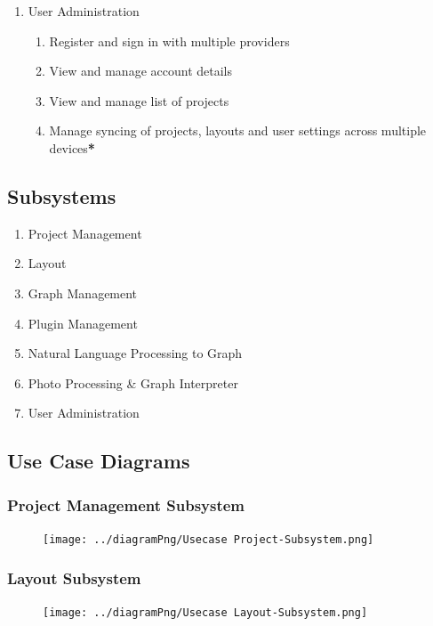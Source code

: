 \documentclass[11pt,a4paper]{article}
\begin{document}
\begin{enumerate}[label=\arabic*.]
    \item User Administration
    \begin{enumerate}[label*=\arabic*.]
	\item Register and sign in with multiple providers
	\item View and manage account details
	\item View and manage list of projects
	\item Manage syncing of projects, layouts and user settings across multiple
	devices\textbf{*}
    \end{enumerate}
\end{enumerate}

\subsection*{Subsystems}
\begin{enumerate}
    \item Project Management
    \item Layout
    \item Graph Management
    \item Plugin Management
    \item Natural Language Processing to Graph
    \item Photo Processing \& Graph Interpreter
    \item User Administration
\end{enumerate}

\pagebreak

\subsection*{Use Case Diagrams}

\subsubsection*{Project Management Subsystem}
\begin{figure}[htbp]
    \centering
    \texttt{[image: ../diagramPng/Usecase Project-Subsystem.png]}
\end{figure}

\pagebreak
\subsubsection*{Layout Subsystem}
\begin{figure}[htbp]
    \centering
     \texttt{[image: ../diagramPng/Usecase Layout-Subsystem.png]}
\end{figure}
\end{document}
